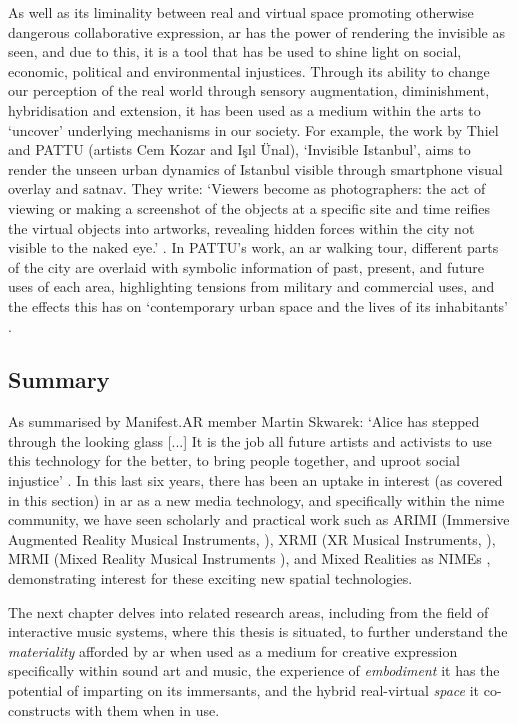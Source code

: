 As well as its liminality between real and virtual space promoting otherwise dangerous collaborative expression, \gls{ar} has the power of rendering the invisible as seen, and due to this, it is a tool that has be used to shine light on social, economic, political and environmental injustices. Through its ability to change our perception of the real world through sensory augmentation, diminishment, hybridisation and extension, it has been used as a medium within the arts to `uncover' underlying mechanisms in our society. For example, the work by Thiel and PATTU (artists Cem Kozar and Işıl Ünal), `Invisible Istanbul', aims to render the unseen urban dynamics of Istanbul visible through smartphone visual overlay and \gls{satnav}. They write: `Viewers become as photographers: the act of viewing or making a screenshot of the objects at a specific site and time reifies the virtual objects into artworks, revealing hidden forces within the city not visible to the naked eye.' \citeyearpar{thiel2011}. In PATTU's work, an \gls{ar} walking tour, different parts of the city are overlaid with symbolic information of past, present, and future uses of each area, highlighting tensions from military and commercial uses, and the effects this has on `contemporary urban space and the lives of its inhabitants' \citeyearpar{thiel2018}.

\subsection{Summary}
As summarised by Manifest.AR member Martin Skwarek: `Alice has stepped through the looking glass [...] It is the job all future artists and activists to use this technology for the better, to bring people together, and uproot social injustice' \citeyearpar{skwarek2018}. In this last six years, there has been an uptake in interest (as covered in this section) in \gls{ar} as a new media technology, and specifically within the \gls{nime} community, we have seen scholarly and practical work such as ARIMI (Immersive Augmented Reality Musical Instruments, \citep{chevalier2017}), XRMI (XR Musical Instruments, \citep{camci2021}), MRMI (Mixed Reality Musical Instruments \citep{zellerbach2022}), and Mixed Realities as NIMEs \citep{bilbow2023}, demonstrating interest for these exciting new spatial technologies.

The next chapter delves into related research areas, including from the field of interactive music systems, where this thesis is situated, to further understand the \textit{materiality} afforded by \gls{ar} when used as a medium for creative expression specifically within sound art and music, the experience of \textit{embodiment} it has the potential of imparting on its immersants, and the hybrid real-virtual \textit{space} it co-constructs with them when in use.